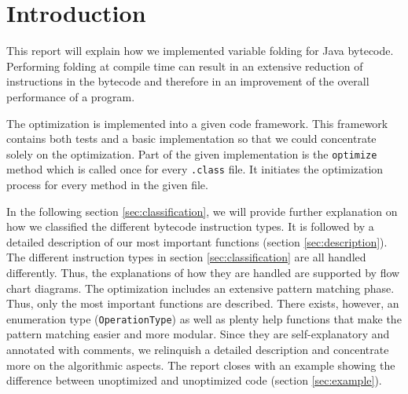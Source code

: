 \section{Introduction}

This report will explain how we implemented variable folding for Java bytecode. Performing folding at compile time can result in an extensive reduction of instructions in the bytecode and therefore in an improvement of the overall performance of a program.

The optimization is implemented into a given code framework. This framework contains both tests and a basic implementation so that we could concentrate solely on the optimization. Part of the given implementation is the \texttt{optimize} method which is called once for every \texttt{.class} file. It initiates the optimization process for every method in the given file. 

In the following section \ref{sec:classification}, we will provide further explanation on how we classified the different bytecode instruction types. It is followed by a detailed description of our most important functions (section \ref{sec:description}). The different instruction types in section \ref{sec:classification} are all handled differently. Thus, the explanations of how they are handled are supported by flow chart diagrams. The optimization includes an extensive pattern matching phase. Thus, only the most important functions are described. There exists, however, an enumeration type (\texttt{OperationType}) as well as plenty help functions that make the pattern matching easier and more modular. Since they are self-explanatory and annotated with comments, we relinquish a detailed description and concentrate more on the algorithmic aspects. The report closes with an example showing the difference between unoptimized and unoptimized code (section \ref{sec:example}).